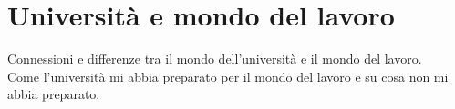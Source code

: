\section{Università e mondo del lavoro}
\label{sez:universita-mondo-lavoro}

Connessioni e differenze tra il mondo dell'università e il mondo del lavoro.\\
Come l'università mi abbia preparato per il mondo del lavoro e su cosa non mi abbia preparato.\\
